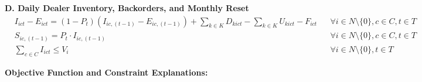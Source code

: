 \documentclass{article}
\begin{document}
\newpage
\textbf{D. Daily Dealer Inventory, Backorders, and Monthly Reset} \\
\begin{align}
& I_{ict} - E_{ict} = (1 - P_t)(I_{ic, (t-1)} - E_{ic, (t-1)}) + \sum_{k \in K} D_{kict} - \sum_{k \in K} U_{kict} - F_{ict} && \forall i \in N \setminus \{0\}, c \in C, t \in T \label{eq:inventory_flow} \\
& S_{ic, (t-1)} = P_t \cdot I_{ic, (t-1)} && \forall i \in N \setminus \{0\}, c \in C, t \in T \label{eq:salvage} \\
& \sum_{c \in C} I_{ict} \le V_i && \forall i \in N \setminus \{0\}, t \in T \label{eq:dealer_capacity}
\end{align}

\vspace{1em}
\textbf{Objective Function and Constraint Explanations:}
\end{document}
